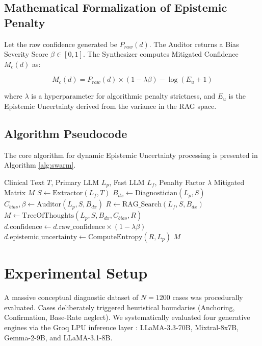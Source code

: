 \documentclass{svproc}
\begin{document}
\subsection{Mathematical Formalization of Epistemic Penalty}
Let the raw confidence generated be $P_{raw}(d)$. The Auditor returns a Bias Severity Score $\beta \in [0,1]$.
The Synthesizer computes Mitigated Confidence $M_c(d)$ as:

\begin{equation}\label{eq:mitigation}
M_c(d) = P_{raw}(d) \times (1 - \lambda \beta) - \log(E_u + 1)
\end{equation}

where $\lambda$ is a hyperparameter for algorithmic penalty strictness, and $E_u$ is the Epistemic Uncertainty derived from the variance in the RAG space. 

\subsection{Algorithm Pseudocode}
The core algorithm for dynamic Epistemic Uncertainty processing is presented in Algorithm \ref{alg:swarm}.

\begin{algorithm}
\caption{Cognitive Swarm Bias Mitigation}
\label{alg:swarm}
\begin{algorithmic}[1]
\REQUIRE Clinical Text $T$, Primary LLM $L_p$, Fast LLM $L_f$, Penalty Factor $\lambda$
\ENSURE Mitigated Matrix $M$
\STATE $S \leftarrow \text{Extractor}(L_f, T)$
\STATE $B_{dx} \leftarrow \text{Diagnostician}(L_p, S)$ 
\STATE $C_{bias}, \beta \leftarrow \text{Auditor}(L_p, S, B_{dx})$ 
\STATE $R \leftarrow \text{RAG\_Search}(L_f, S, B_{dx})$ 
\STATE $M \leftarrow \text{TreeOfThoughts}(L_p, S, B_{dx}, C_{bias}, R)$
        \STATE $d.\text{confidence} \leftarrow d.\text{raw\_confidence} \times (1 - \lambda \beta)$
    \ENDIF
    \STATE $d.\text{epistemic\_uncertainty} \leftarrow \text{ComputeEntropy}(R, L_p)$
\ENDFOR
\RETURN $M$
\end{algorithmic}
\end{algorithm}

\section{Experimental Setup}\label{sec:experiments}
A massive conceptual diagnostic dataset of $N=1200$ cases was procedurally evaluated. Cases deliberately triggered heuristical boundaries (Anchoring, Confirmation, Base-Rate neglect). We systematically evaluated four generative engines via the Groq LPU inference layer \cite{touvron2023llama, jiang2024mixtral}: LLaMA-3.3-70B, Mixtral-8x7B, Gemma-2-9B, and LLaMA-3.1-8B.
\end{document}
